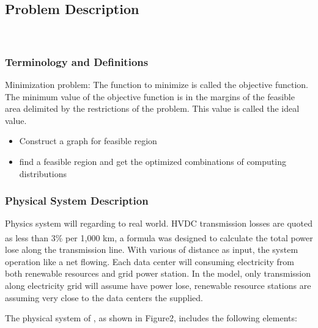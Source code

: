 \documentclass[12pt]{article}
\begin{document}
\subsection{Problem Description} \label{Sec_pd}

 \\

\subsubsection{Terminology and  Definitions}\label{ssc:terminology-definitions}
\label{ssc:TM}

 {Minimization problem: The function to minimize is called the objective function. The minimum value of the objective function is in the margins of the feasible area delimited by the restrictions of the problem. This value is called the ideal value.
   }



\begin{itemize}
\item Construct a graph for feasible region
\item find a feasible region and get the optimized combinations of computing distributions

\end{itemize}

\subsubsection{Physical System Description} \label{sec_phySystDescrip}

{Physics system will regarding to real world. HVDC transmission losses are quoted as less than 3\% per 1,000 km\textsuperscript{\cite{rosellon2003different}}, a formula was designed to calculate the total power lose along the transmission line. With various of distance as input, the system operation like a net flowing. Each data center will consuming electricity from both renewable resources and grid power station. In the model, only transmission along electricity grid will assume have power lose, renewable resource stations are assuming very close to the data centers the supplied.  }

The physical system of \progname{}, as shown in Figure2,
includes the following elements:
\end{document}
